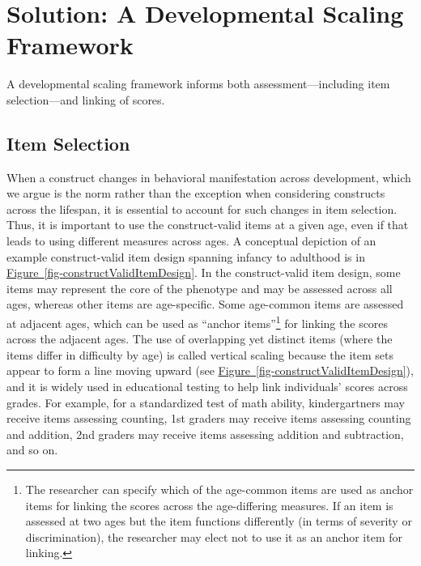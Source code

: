 \documentclass[
  american,
  letterpaper,
  12pt]{article}
\begin{document}
\section{Solution: A Developmental Scaling
Framework}\label{solution-a-developmental-scaling-framework}

A developmental scaling framework informs both assessment---including
item selection---and linking of scores.

\subsection{Item Selection}\label{item-selection}

When a construct changes in behavioral manifestation across development,
which we argue is the norm rather than the exception when considering
constructs across the lifespan, it is essential to account for such
changes in item selection. Thus, it is important to use the
construct-valid items at a given age, even if that leads to using
different measures across ages. A conceptual depiction of an example
construct-valid item design spanning infancy to adulthood is in
\hyperref[fig-constructValidItemDesign]{Figure~\ref*{fig-constructValidItemDesign}}.
In the construct-valid item design, some items may represent the core of
the phenotype and may be assessed across all ages, whereas other items
are age-specific. Some age-common items are assessed at adjacent ages,
which can be used as ``anchor items''\footnote{The researcher can
  specify which of the age-common items are used as anchor items for
  linking the scores across the age-differing measures. If an item is
  assessed at two ages but the item functions differently (in terms of
  severity or discrimination), the researcher may elect not to use it as
  an anchor item for linking.} for linking the scores across the
adjacent ages. The use of overlapping yet distinct items (where the
items differ in difficulty by age) is called vertical scaling because
the item sets appear to form a line moving upward (see
\hyperref[fig-constructValidItemDesign]{Figure~\ref*{fig-constructValidItemDesign}}),
and it is widely used in educational testing to help link individuals'
scores across grades. For example, for a standardized test of math
ability, kindergartners may receive items assessing counting, 1st
graders may receive items assessing counting and addition, 2nd graders
may receive items assessing addition and subtraction, and so on.

\par\addvspace{\baselineskip}\begingroup
\end{document}
